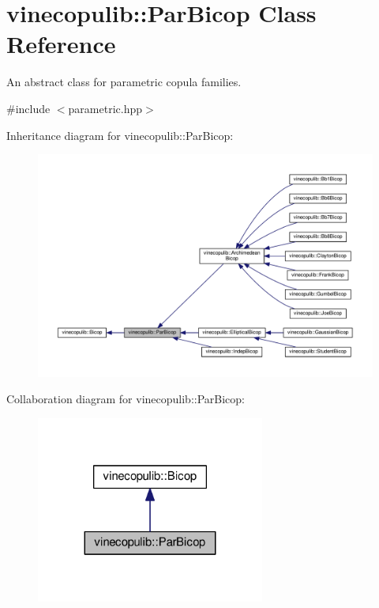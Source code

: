 \hypertarget{classvinecopulib_1_1_par_bicop}{}\section{vinecopulib\+:\+:Par\+Bicop Class Reference}
\label{classvinecopulib_1_1_par_bicop}


An abstract class for parametric copula families.  




{\ttfamily \#include $<$parametric.\+hpp$>$}



Inheritance diagram for vinecopulib\+:\+:Par\+Bicop\+:\nopagebreak
\begin{figure}[H]
\begin{center}
\leavevmode
\includegraphics[width=350pt]{classvinecopulib_1_1_par_bicop__inherit__graph}
\end{center}
\end{figure}


Collaboration diagram for vinecopulib\+:\+:Par\+Bicop\+:\nopagebreak
\begin{figure}[H]
\begin{center}
\leavevmode
\includegraphics[width=213pt]{classvinecopulib_1_1_par_bicop__coll__graph}
\end{center}
\end{figure}
